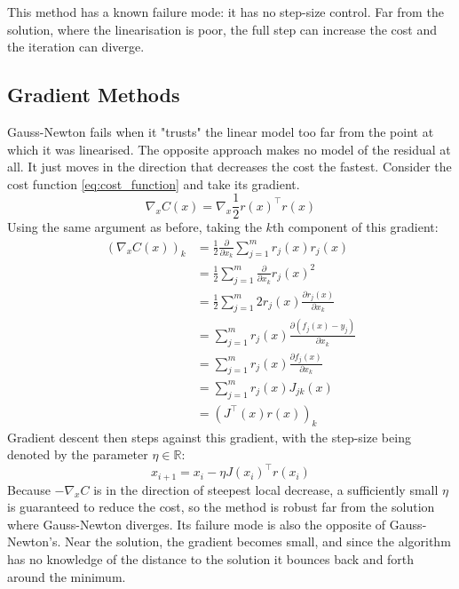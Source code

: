 This method has a known failure mode: it has no step-size control. Far from the solution, where the linearisation is poor, the full step can increase the cost and the iteration can diverge.
\subsection{Gradient Methods}
Gauss-Newton fails when it "trusts" the linear model too far from the point at which it was linearised. The opposite approach makes no model of the residual at all. It just moves in the direction that decreases the cost the fastest. Consider the cost function \eqref{eq:cost_function} and take its gradient.
\begin{equation}
  \nabla_x C(x) = \nabla_x \frac{1}{2} r(x)^\top r(x)
\end{equation}
Using the same argument as before, taking the $k$th component of this gradient:
\begin{align}
  \left(\nabla_x C(x)\right)_k &= \frac{1}{2} \frac{\partial}{\partial x_k} \sum_{j = 1}^{m} r_j(x) r_j(x) \\
                &= \frac{1}{2} \sum_{j = 1}^{m} \frac{\partial}{\partial x_k} r_j(x)^2 \\
                &= \frac{1}{2} \sum_{j = 1}^m 2r_j(x) \frac{\partial r_j(x)}{\partial x_k} \\
                &= \sum_{j = 1}^m r_j(x) \frac{\partial (f_j(x) - y_j)}{\partial x_k} \\
                &= \sum_{j = 1}^m r_j(x) \frac{\partial f_j(x)}{\partial x_k} \\
                &= \sum_{j=1}^m r_j(x) J_{jk}(x) \\
                &= \left(J^\top(x) r(x)\right)_k
\end{align}
Gradient descent then steps against this gradient, with the step-size being denoted by the parameter $\eta \in \mathbb{R}$:
\begin{equation}
  x_{i + 1} = x_i - \eta J(x_i)^\top r(x_i) 
\end{equation}
Because $-\nabla_x C$ is in the direction of steepest local decrease, a sufficiently small $\eta$ is guaranteed to reduce the cost, so the method is robust far from the solution where Gauss-Newton diverges. Its failure mode is also the opposite of Gauss-Newton's. Near the solution, the gradient becomes small, and since the algorithm has no knowledge of the distance to the solution it bounces back and forth around the minimum.

